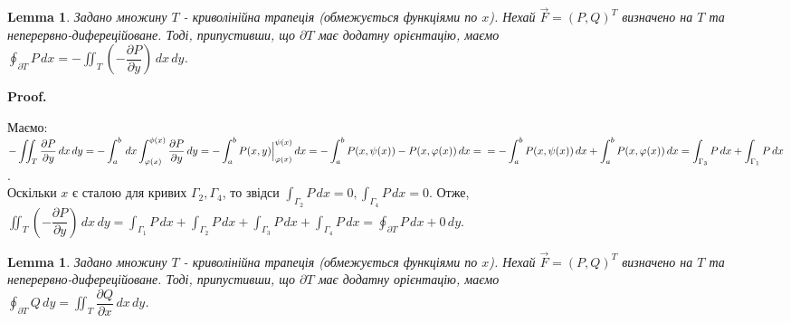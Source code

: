 \documentclass[a4paper, 10pt]{article}
\makeatletter
\def\departial#1#2{\dfrac{\partial {#1}}{\partial {#2}}}
\def\qed{$\blacksquare$}
\theoremstyle{theoremdd}
\theoremstyle{theoremdd}
\theoremstyle{theoremdd}
\theoremstyle{theoremdd}
\theoremstyle{theoremdd}
\theoremstyle{theoremdd}
\theoremstyle{theoremdd}
\theoremstyle{theoremdd}
\theoremstyle{theoremdd}
\theoremstyle{theoremdd}
\theoremstyle{theoremdd}
\theoremstyle{theoremdd}
\theoremstyle{theoremdd}
\newtheorem{lemma}[theorem]{Lemma}
\theoremstyle{theoremdd}
\theoremstyle{theoremdd}
\renewenvironment{proof}[1][Proof.\\]{\par
\pushQED{\hfill \qed}%
\normalfont \topsep6\p@\@plus6\p@\relax
\trivlist
\item\relax
{\bfseries
#1\@addpunct{.}}\hspace\labelsep\ignorespaces
}{%
\popQED\endtrivlist\@endpefalse
}
\makeatother
\begin{document}
\begin{lemma}
Задано множину $T$ - криволінійна трапеція (обмежується функціями по $x$). Нехай $\vec{F} = (P,Q)^T$ визначено на $T$ та неперервно-дифереційоване. Тоді, припустивши, що $\partial  T$ має додатну орієнтацію, маємо\\
$\displaystyle\oint_{\partial T} P\,dx = -\iint_T \left( - \departial{P}{y} \right)\,dx\,dy$.
\end{lemma}

\begin{proof}
\begin{figure}[H]
\centering
{}
\end{figure}
Маємо:\\
$-\displaystyle\iint_T \departial{P}{y}\,dx\,dy = -\int_a^b\,dx \int_{\varphi(x)}^{\phi(x)} \departial{P}{y}\,dy =-\int_a^b P(x,y)\Big|_{\varphi(x)}^{\psi(x)}\,dx = -\int_a^b P(x,\psi(x))-P(x,\varphi(x))\,dx = \\
= -\int_a^b P(x,\psi(x))\,dx + \int_a^b P(x,\varphi(x))\,dx = \int_{\Gamma_3} P\,dx + \int_{\Gamma_1} P\,dx$.\\
Оскільки $x$ є сталою для кривих $\Gamma_2,\Gamma_4$, то звідси $\displaystyle\int_{\Gamma_2} P\,dx = 0, \int_{\Gamma_4} P\,dx = 0$. Отже,\\
$\displaystyle\iint_T \left( -\departial{P}{y} \right)\,dx\,dy = \int_{\Gamma_1} P\,dx + \int_{\Gamma_2} P\,dx + \int_{\Gamma_3} P\,dx + \int_{\Gamma_4} P\,dx = \oint_{\partial T}P\,dx + 0\,dy$.
\end{proof}

\begin{lemma}
Задано множину $T$ - криволінійна трапеція (обмежується функціями по $x$). Нехай $\vec{F} = (P,Q)^T$ визначено на $T$ та неперервно-дифереційоване. Тоді, припустивши, що $\partial  T$ має додатну орієнтацію, маємо\\
$\displaystyle\oint_{\partial T} Q\,dy = \iint_T \departial{Q}{x}\,dx\,dy$.
\end{lemma}
\end{document}

